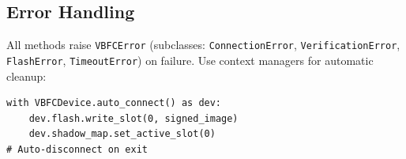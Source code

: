 \subsection{Error Handling}
All methods raise \texttt{VBFCError} (subclasses: \texttt{ConnectionError}, \texttt{VerificationError}, \texttt{FlashError}, \texttt{TimeoutError}) on failure. Use context managers for automatic cleanup:
\begin{lstlisting}[style=vbfcStyle, caption={Context Manager Usage}, label={lst:host_context}]
with VBFCDevice.auto_connect() as dev:
    dev.flash.write_slot(0, signed_image)
    dev.shadow_map.set_active_slot(0)
# Auto-disconnect on exit
\end{lstlisting}